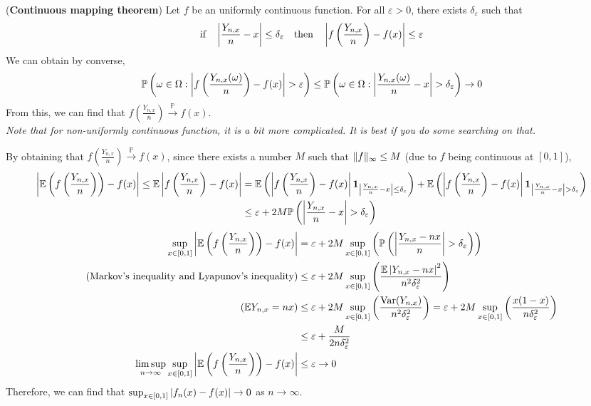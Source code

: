 \documentclass{huhtakm-template-book}
\newcommand{\prob}{\mathbb{P}}
\newcommand{\expect}{\mathbb{E}}
\DeclareMathOperator{\Var}{Var}
\begin{document}
\begin{thm}(\textbf{Continuous mapping theorem})
	Let $f$ be an uniformly continuous function. For all $\varepsilon>0$, there exists $\delta_{\varepsilon}$ such that
	\begin{equation*}
		\text{if}\quad\left|{\frac{Y_{n,x}}{n}-x}\right|\leq\delta_{\varepsilon}\quad\text{then}\quad\left|{f\left(\frac{Y_{n,x}}{n}\right)-f(x)}\right|\leq\varepsilon
	\end{equation*}
	We can obtain by converse,
	\begin{equation*}
		\prob\left(\omega\in\Omega:\abs{f\left(\frac{Y_{n,x}(\omega)}{n}\right)-f(x)}>\varepsilon\right)\leq\prob\left(\omega\in\Omega:\abs{\frac{Y_{n,x}(\omega)}{n}-x}>\delta_{\varepsilon}\right)\to 0
	\end{equation*}
	From this, we can find that $f\left(\frac{Y_{n,x}}{n}\right)\xrightarrow{\prob}f(x)$.\\
	\textit{Note that for non-uniformly continuous function, it is a bit more complicated. It is best if you do some searching on that.}
\end{thm}
\newpage
\begin{eg}
	By obtaining that $f\left(\frac{Y_{n,x}}{n}\right)\xrightarrow{\prob}f(x)$, since there exists a number $M$ such that $\lVert{f}\rVert_{\infty}\leq M$ (due to $f$ being continuous at $[0,1]$),
	\begin{align*}
		\abs{\expect\left(f\left(\frac{Y_{n,x}}{n}\right)\right)-f(x)}\leq\expect\abs{f\left(\frac{Y_{n,x}}{n}\right)-f(x)}&=\expect\left(\abs{f\left(\frac{Y_{n,x}}{n}\right)-f(x)}\mathbf{1}_{\abs{\frac{Y_{n,x}}{n}-x}\leq\delta_{\varepsilon}}\right)+\expect\left(\abs{f\left(\frac{Y_{n,x}}{n}\right)-f(x)}\mathbf{1}_{\abs{\frac{Y_{n,x}}{n}-x}>\delta_{\varepsilon}}\right)\\
		&\leq\varepsilon+2M\prob\left(\abs{\frac{Y_{n,x}}{n}-x}>\delta_{\varepsilon}\right)
	\end{align*}
	\begin{align*}
		\sup_{x\in[0,1]}\abs{\expect\left(f\left(\frac{Y_{n,x}}{n}\right)\right)-f(x)}&=\varepsilon+2M\sup_{x\in [0,1]}\left(\prob\left(\abs{\frac{Y_{n,x}-nx}{n}}>\delta_{\varepsilon}\right)\right)\\
		\tag{Markov's inequality and Lyapunov's inequality}
		&\leq\varepsilon+2M\sup_{x\in[0,1]}\left(\frac{\expect\abs{Y_{n,x}-nx}^{2}}{n^{2}\delta_{\varepsilon}^{2}}\right)\\
		\tag{$\expect Y_{n,x}=nx$}
		&\leq\varepsilon+2M\sup_{x\in[0,1]}\left(\frac{\Var(Y_{n,x})}{n^{2}\delta_{\varepsilon}^{2}}\right)=\varepsilon+2M\sup_{x\in[0,1]}\left(\frac{x(1-x)}{n\delta_{\varepsilon}^{2}}\right)\\
		&\leq\varepsilon+\frac{M}{2n\delta_{\varepsilon}^{2}}\\
		\limsup_{n\to\infty}\sup_{x\in[0,1]}\abs{\expect\left(f\left(\frac{Y_{n,x}}{n}\right)\right)-f(x)}&\leq\varepsilon\to 0
	\end{align*}
	Therefore, we can find that $\sup_{x\in[0,1]}\left|{f_{n}(x)-f(x)}\right|\to 0$ as $n\to\infty$.
\end{eg}
\end{document}
